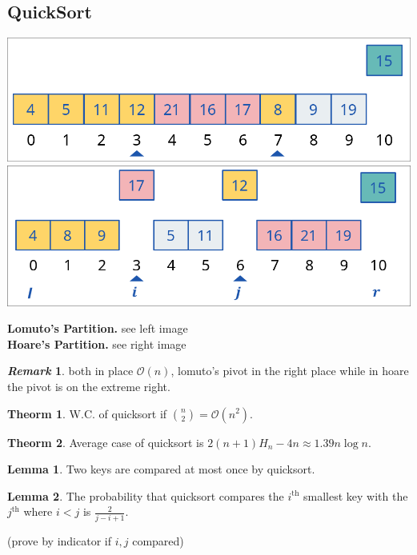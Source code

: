 \documentclass[]{article}
\newcommand\compactsubsection[1]        {\vspace{-10pt}\subsection{#1}\vspace{-6pt}}
\theoremstyle{definition}
\newtheorem{Theorem}{\color{theoColor}Theorm}
\newtheorem{Lemma}{\color{lemColor}Lemma}
\newtheorem{Remark}{\textit{Remark}}
\newcommand\theo  [1] {\begin{Theorem}#1\end{Theorem}}
\newcommand\lem   [1] {\begin{Lemma}#1\end{Lemma}}
\newcommand\oc    {\mathcal{O}}
\newcommand\logn      {\log n}
\begin{document}
\begin{multicols}{4}
			\compactsubsection{QuickSort}
				\begin{center}
					\includegraphics[width=0.51\linewidth]{images/lomuto}
					\includegraphics[width=0.45\linewidth]{images/horse}
				\end{center}

				\textbf{Lomuto's Partition. } see left image \\
				\textbf{Hoare's Partition. } see right image
				
				\begin{Remark}
					both in place $\oc(n)$, lomuto's pivot in the right place while in hoare the pivot is on the extreme right. 
				\end{Remark}
				
				\theo{W.C. of quicksort if $\binom{n}{2} = \oc(n^2)$. }
				\theo{Average case of quicksort is $2(n + 1)H_n - 4n \approx 1.39n\logn$. }
				\lem{Two keys are compared at most once by quicksort. }
				\lem{The probability that quicksort compares the $i^{\text{th}}$ smallest key with the $j^{\text{th}}$ where $i< j$ is $\frac{2}{j - i + 1}$. }
				(prove by indicator if $i, j$ compared)
		

\end{multicols}
\end{document}
